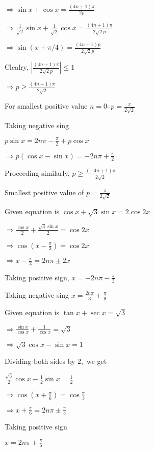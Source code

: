   $\Rightarrow \sin x + \cos x = \frac{(4n + 1)\pi}{2p}$

  $\Rightarrow \frac{1}{\sqrt{2}}\sin x + \frac{1}{\sqrt{2}}\cos x = \frac{(4n + 1)\pi}{2\sqrt{2}p}$

  $\Rightarrow \sin(x + \pi/4) = \frac{(4n + 1)p}{2\sqrt{2}p}$

  Clealry, $\left|\frac{(4n + 1)\pi}{2\sqrt{2}p}\right|\leq 1$

  $\Rightarrow p \geq \frac{(4n + 1)\pi}{2\sqrt{2}}$

  For smallest positive value $n = 0 \therefore p = \frac{\pi}{2\sqrt{2}}$

  Taking negative sing

  $p\sin x = 2n\pi - \frac{\pi}{2} + p\cos x$

  $\Rightarrow p(\cos x - \sin x) = -2n\pi + \frac{\pi}{2}$

  Proceeding similarly, $p \geq \frac{(-4n + 1)\pi}{2\sqrt{2}}$

  Smallest positive value of $p = \frac{\pi}{2\sqrt{2}}$

\item Given equation is $\cos x + \sqrt{3}\sin x = 2\cos2x$

  $\Rightarrow \frac{\cos x}{2} + \frac{\sqrt{3}\sin x}{2} = \cos 2x$

  $\Rightarrow \cos \left(x - \frac{\pi}{3}\right) = \cos 2x$

  $\Rightarrow x - \frac{\pi}{3} = 2n\pi \pm 2x$

  Taking positive sign, $x = -2n\pi - \frac{\pi}{3}$

  Taking negative sing $x = \frac{2n\pi}{3} + \frac{\pi}{9}$

\item Given equation is $\tan x+ \sec x = \sqrt{3}$

  $\Rightarrow \frac{\sin x}{\cos x} + \frac{1}{\cos x} = \sqrt{3}$

  $\Rightarrow \sqrt{3}\cos x - \sin x = 1$

  Dividing both sides by $2,$ we get

  $\frac{\sqrt{3}}{2}\cos x - \frac{1}{2}\sin x = \frac{1}{2}$

  $\Rightarrow \cos\left(x + \frac{\pi}{6}\right) = \cos \frac{\pi}{3}$

  $\Rightarrow x + \frac{\pi}{6} = 2n\pi \pm \frac{\pi}{3}$

  Taking positive sign

  $x = 2n\pi + \frac{\pi}{6}$

